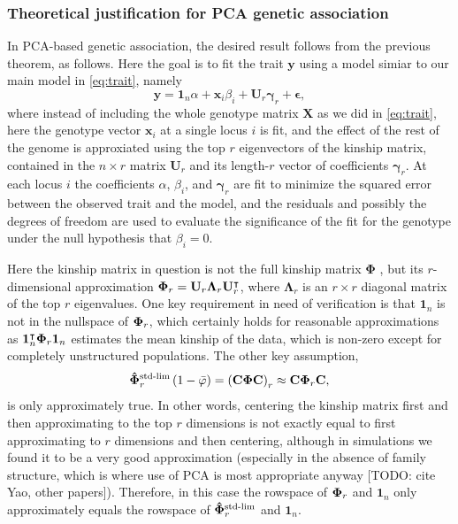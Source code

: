 \documentclass[11pt]{article}
\newcommand{\kinMat}{%
  \ensuremath{%
    \mathbf{\Phi}
  }%
  \xspace%
}%
\newcommand{\kinMatStdLim}{%
  \ensuremath{%
    \mathbf{\hat{\Phi}}^\text{std-lim}
  }%
  \xspace%
}%
\begin{document}
\subsubsection{Theoretical justification for PCA genetic association}

In PCA-based genetic association, the desired result follows from the previous theorem, as follows.
Here the goal is to fit the trait $\mathbf{y}$ using a model simiar to our main model in \cref{eq:trait}, namely
\begin{equation}
  \label{eq:pca_gwas}
  \mathbf{y}
  =
  \mathbf{1}_n \alpha + \mathbf{x}_i \beta_i + \mathbf{U}_r \mathbf{\gamma}_r + \mathbf{\epsilon}
  ,
\end{equation}
where instead of including the whole genotype matrix $\mathbf{X}$ as we did in \cref{eq:trait}, here the genotype vector $\mathbf{x}_i$ at a single locus $i$ is fit, and the effect of the rest of the genome is approxiated using the top $r$ eigenvectors of the kinship matrix, contained in the $n \times r$ matrix $\mathbf{U}_r$ and its length-$r$ vector of coefficients $\mathbf{\gamma}_r$.
At each locus $i$ the coefficients $\alpha$, $\beta_i$, and $\mathbf{\gamma}_r$ are fit to minimize the squared error between the observed trait and the model, and the residuals and possibly the degrees of freedom are used to evaluate the significance of the fit for the genotype under the null hypothesis that $\beta_i = 0$.

Here the kinship matrix in question is not the full kinship matrix \kinMat, but its $r$-dimensional approximation $\kinMat_r = \mathbf{U}_r \mathbf{\Lambda}_r \mathbf{U}_r^\intercal$, where $\mathbf{\Lambda}_r$ is an $r \times r$ diagonal matrix of the top $r$ eigenvalues.
One key requirement in need of verification is that $\mathbf{1}_n$ is not in the nullspace of $\kinMat_r$, which certainly holds for reasonable approximations as $\mathbf{1}_n^\intercal \kinMat_r \mathbf{1}_n$ estimates the mean kinship of the data, which is non-zero except for completely unstructured populations.
The other key assumption,
$$
\kinMatStdLim_r \left( 1 - \bar{\varphi} \right)
=
\left( \mathbf{C} \kinMat \mathbf{C} \right)_r
\approx
\mathbf{C} \kinMat_r \mathbf{C},
$$
is only approximately true.
In other words, centering the kinship matrix first and then approximating to the top $r$ dimensions is not exactly equal to first approximating to $r$ dimensions and then centering, although in simulations we found it to be a very good approximation (especially in the absence of family structure, which is where use of PCA is most appropriate anyway [TODO: cite Yao, other papers]).
Therefore, in this case the rowspace of $\kinMat_r$ and $\mathbf{1}_n$ only approximately equals the rowspace of $\kinMatStdLim_r$ and $\mathbf{1}_n$.
\end{document}
